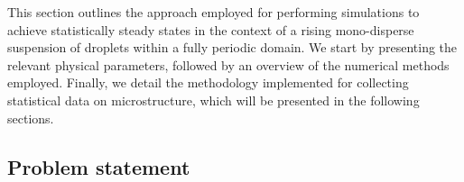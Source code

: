 This section outlines the approach employed for performing simulations to achieve statistically steady states in the context of a rising mono-disperse suspension of droplets within a fully periodic domain.
We start by presenting the relevant physical parameters, followed by an overview of the numerical methods employed.
Finally, we detail the methodology implemented for collecting statistical data on microstructure, which will be presented in the following sections.



\subsection{Problem statement}

